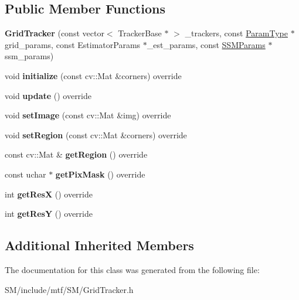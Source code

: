 \subsection*{Public Member Functions}
\begin{DoxyCompactItemize}
\item 
\hypertarget{classGridTracker_a6065b5355c9cf487a8ea792fe9ff3853}{{\bfseries Grid\-Tracker} (const vector$<$ Tracker\-Base $\ast$ $>$ \-\_\-trackers, const \hyperlink{structGridTrackerParams}{Param\-Type} $\ast$grid\-\_\-params, const Estimator\-Params $\ast$\-\_\-est\-\_\-params, const \hyperlink{structSSMParams}{S\-S\-M\-Params} $\ast$ssm\-\_\-params)}\label{classGridTracker_a6065b5355c9cf487a8ea792fe9ff3853}

\item 
\hypertarget{classGridTracker_a6a960a1b2eb3929890c8658026dc8886}{void {\bfseries initialize} (const cv\-::\-Mat \&corners) override}\label{classGridTracker_a6a960a1b2eb3929890c8658026dc8886}

\item 
\hypertarget{classGridTracker_afeb93151e74fc1d6c3c233ac59634482}{void {\bfseries update} () override}\label{classGridTracker_afeb93151e74fc1d6c3c233ac59634482}

\item 
\hypertarget{classGridTracker_a43191bbe675287dca403c6369689040b}{void {\bfseries set\-Image} (const cv\-::\-Mat \&img) override}\label{classGridTracker_a43191bbe675287dca403c6369689040b}

\item 
\hypertarget{classGridTracker_a7e8f8460f269d89da0ffe6de94052fb7}{void {\bfseries set\-Region} (const cv\-::\-Mat \&corners) override}\label{classGridTracker_a7e8f8460f269d89da0ffe6de94052fb7}

\item 
\hypertarget{classGridTracker_a5b38060ac41e9d231761645217354c21}{const cv\-::\-Mat \& {\bfseries get\-Region} () override}\label{classGridTracker_a5b38060ac41e9d231761645217354c21}

\item 
\hypertarget{classGridTracker_a5ae3964ff089b564b1ae8ce66461dbce}{const uchar $\ast$ {\bfseries get\-Pix\-Mask} () override}\label{classGridTracker_a5ae3964ff089b564b1ae8ce66461dbce}

\item 
\hypertarget{classGridTracker_a96f6c677416ecf84bdefe138a91226f4}{int {\bfseries get\-Res\-X} () override}\label{classGridTracker_a96f6c677416ecf84bdefe138a91226f4}

\item 
\hypertarget{classGridTracker_aaa2642c417100ea497263d15e28a882d}{int {\bfseries get\-Res\-Y} () override}\label{classGridTracker_aaa2642c417100ea497263d15e28a882d}

\end{DoxyCompactItemize}
\subsection*{Additional Inherited Members}


The documentation for this class was generated from the following file\-:\begin{DoxyCompactItemize}
\item 
S\-M/include/mtf/\-S\-M/Grid\-Tracker.\-h\end{DoxyCompactItemize}
